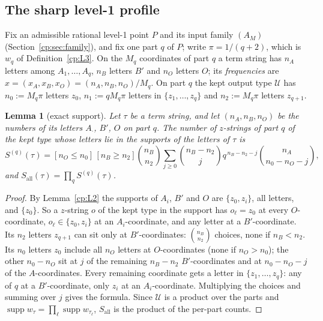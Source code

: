 \documentclass[11pt]{article}
\newtheorem{lemma}[theorem]{Lemma}
\theoremstyle{definition}
\theoremstyle{remark}
\DeclareMathOperator{\supp}{supp}
\newcommand{\Sall}{S_{\mathrm{all}}}          %
\newcommand{\Ukept}{\mathcal{U}}              %
\newcommand{\Bp}{B'}                          %
\newcommand{\Oterm}{O}                        %
\begin{document}
\subsection{The sharp level-1 profile}\label{cp:sec:sharp}

Fix an admissible rational level-1 point $P$ and its input family $(A_M)$ (Section~\ref{cp:sec:family}), and fix one part $q$ of $P$; write $\pi=1/(q+2)$, which is $w_q$ of Definition~\ref{cp:L3}. On the $M_q$ coordinates of part $q$ a term string has $n_A$ letters among $A_1,\dots,A_q$, $n_B$ letters $\Bp$ and $n_O$ letters $\Oterm$; its \emph{frequencies} are $x=(x_A,x_B,x_O)=(n_A,n_B,n_O)/M_q$. On part $q$ the kept output type $\Ukept$ has $n_0:=M_q\pi$ letters $z_0$, $n_1:=qM_q\pi$ letters in $\{z_1,\dots,z_q\}$ and $n_2:=M_q\pi$ letters $z_{q+1}$.

\begin{lemma}[exact support]\label{cp:G1:support}
Let $\tau$ be a term string, and let $(n_A,n_B,n_O)$ be the numbers of its letters $A_\cdot$, $\Bp$, $\Oterm$ on part $q$. The number of $z$-strings of part $q$ of the kept type whose letters lie in the supports of the letters of $\tau$ is
\[
S^{(q)}(\tau)=[n_O\le n_0]\,[n_B\ge n_2]\binom{n_B}{n_2}\sum_{j\ge0}\binom{n_B-n_2}{j}q^{\,n_B-n_2-j}\binom{n_A}{n_0-n_O-j},
\]
and $\Sall(\tau)=\prod_qS^{(q)}(\tau)$.
\end{lemma}

\begin{proof}
By Lemma~\ref{cp:L2} the supports of $A_i$, $\Bp$ and $\Oterm$ are $\{z_0,z_i\}$, all letters, and $\{z_0\}$. So a $z$-string $o$ of the kept type in the support has $o_\ell=z_0$ at every $\Oterm$-coordinate, $o_\ell\in\{z_0,z_i\}$ at an $A_i$-coordinate, and any letter at a $\Bp$-coordinate. Its $n_2$ letters $z_{q+1}$ can sit only at $\Bp$-coordinates: $\binom{n_B}{n_2}$ choices, none if $n_B<n_2$. Its $n_0$ letters $z_0$ include all $n_O$ letters at $\Oterm$-coordinates (none if $n_O>n_0$); the other $n_0-n_O$ sit at $j$ of the remaining $n_B-n_2$ $\Bp$-coordinates and at $n_0-n_O-j$ of the $A$-coordinates. Every remaining coordinate gets a letter in $\{z_1,\dots,z_q\}$: any of $q$ at a $\Bp$-coordinate, only $z_i$ at an $A_i$-coordinate. Multiplying the choices and summing over $j$ gives the formula. Since $\Ukept$ is a product over the parts and $\supp w_\tau=\prod_\ell\supp w_{\tau_\ell}$, $\Sall$ is the product of the per-part counts.
\end{proof}
\end{document}
